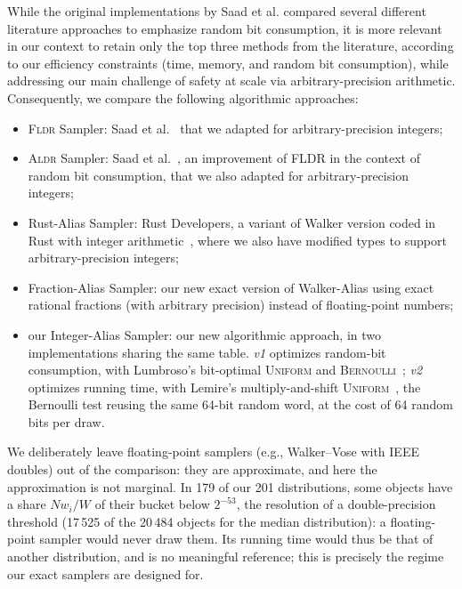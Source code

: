  While the original implementations by Saad et al. compared several different literature approaches to emphasize random bit consumption, it is more relevant in our context to retain only the top three methods from the literature, according to our efficiency constraints (time, memory, and random bit consumption), while addressing our main challenge of safety at scale via arbitrary-precision arithmetic. Consequently, we compare the following algorithmic approaches:
\begin{itemize}
    \item \textsc{Fldr} Sampler: Saad et al.~\cite{SFRM19} that we adapted for arbitrary-precision integers;
    \item \textsc{Aldr} Sampler: Saad et al.~\cite{DS26}, an improvement of FLDR in the context of random bit consumption, that we also adapted for arbitrary-precision integers;
    \item Rust-Alias Sampler: Rust Developers, a variant of Walker version coded in Rust with integer arithmetic~\cite{Rust25}, where we also have modified types to support arbitrary-precision integers;
    \item Fraction-Alias Sampler: our new exact version of Walker-Alias using exact rational fractions (with arbitrary precision) instead of floating-point numbers;
    \item our Integer-Alias Sampler: our new algorithmic approach, in two implementations sharing the same table. \emph{v1} optimizes random-bit consumption, with Lumbroso's bit-optimal \textsc{Uniform} and \textsc{Bernoulli}~\cite{Lumbroso13}; \emph{v2} optimizes running time, with Lemire's multiply-and-shift \textsc{Uniform}~\cite{Lemire19}, the Bernoulli test reusing the same 64-bit random word, at the cost of 64 random bits per draw.
\end{itemize}

We deliberately leave floating-point samplers (e.g., Walker--Vose with IEEE doubles) out of the comparison:
they are approximate, and here the approximation is not marginal. In 179 of our 201 distributions, some
objects have a share $N w_i / W$ of their bucket below $2^{-53}$, the resolution of a double-precision
threshold (17\,525 of the 20\,484 objects for the median distribution): a floating-point sampler would
never draw them. Its running time would thus be that of another distribution, and is no meaningful
reference; this is precisely the regime our exact samplers are designed for.


